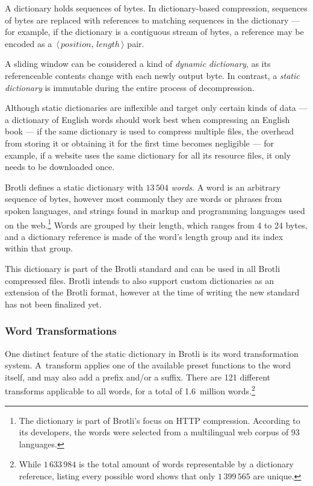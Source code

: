 \documentclass[english,master,dept460,male,cpp,cpdeclaration]{diploma}
\newcommand{\pair}[2]{$\,\langle\,#1,\,#2\,\rangle$}
\begin{document}
	A dictionary holds sequences of bytes. In dictionary-based compression, sequences of bytes are replaced with references to matching sequences in the dictionary --- for example, if the dictionary is a contiguous stream of bytes, a reference may be encoded as a \pair{position}{length} pair.
	
	A sliding window can be considered a kind of \emph{dynamic dictionary}, as its referenceable contents change with each newly output byte. In contrast, a \emph{static dictionary} is immutable during the entire process of decompression.\cite{DataCompressionCompleteReference}
	
	Although static dictionaries are inflexible and target only certain kinds of data --- a dictionary of English words should work best when compressing an English book --- if the same dictionary is used to compress multiple files, the overhead from storing it or obtaining it for the first time becomes negligible --- for example, if a website uses the same dictionary for all its resource files, it only needs to be downloaded once.
	
	Brotli defines a static dictionary with $13\,504$ \emph{words}. A word is an arbitrary sequence of bytes, however most commonly they are words or phrases from spoken languages, and strings found in markup and programming languages used on the web.\footnote{The dictionary is part of Brotli's focus on HTTP compression. According to its developers, the words were selected from a multilingual web corpus of 93 languages\cite{BrotliComparisonStudy}.} Words are grouped by their length, which ranges from 4 to 24 bytes, and a dictionary reference is made of the word's length group and its index within that group.
	
	This dictionary is part of the Brotli standard and can be used in all Brotli compressed files. Brotli intends to also support custom dictionaries as an extension of the Brotli format, however at the time of writing the new standard has not been finalized yet.
	
		\subsubsection{Word Transformations}
		\label{sec:dictionary-word-transformations}
		
		One distinct feature of the static dictionary in Brotli is its word transformation system. A~transform applies one of the available preset functions to the word itself, and may also add a prefix and/or a suffix. There are 121 different transforms applicable to all words, for a total of 1.6~million words.\footnote{While $1\,633\,984$ is the total amount of words representable by a dictionary reference, listing every possible word shows that only $1\,399\,565$ are unique.}
		
\end{document}
